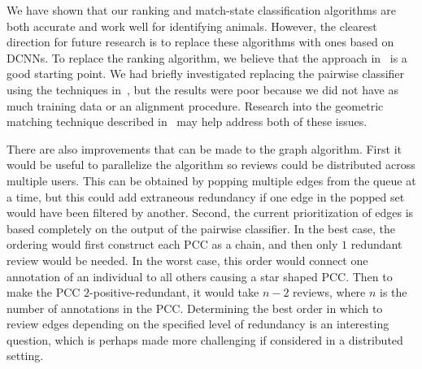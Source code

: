     We have shown that our ranking and match-state classification algorithms are both accurate and work well for
      identifying animals.
    However, the clearest direction for future research is to replace these algorithms with ones based on DCNNs.
    To replace the ranking algorithm, we believe that the approach in~\cite{arandjelovic_netvlad_2016} is a good
      starting point.
    We had briefly investigated replacing the pairwise classifier using the techniques
      in~\cite{taigman_deepface_2014}, but the results were poor because we did not have as much training data or
      an alignment procedure.
    Research into the geometric matching technique described in~\cite{rocco_convolutional_2017} may help address
      both of these issues.

    There are also improvements that can be made to the graph algorithm.
    First it would be useful to parallelize the algorithm so reviews could be distributed across multiple users.
    This can be obtained by popping multiple edges from the queue at a time, but this could add extraneous
      redundancy if one edge in the popped set would have been filtered by another.
    Second, the current prioritization of edges is based completely on the output of the pairwise classifier.
    In the best case, the ordering would first construct each PCC as a chain, and then only $1$ redundant review
      would be needed.
    In the worst case, this order would connect one annotation of an individual to all others causing a star
      shaped PCC.
    Then to make the PCC $2$-positive-redundant, it would take $n - 2$ reviews, where $n$ is the number of
      annotations in the PCC.
    Determining the best order in which to review edges depending on the specified level of redundancy is an
      interesting question, which is perhaps made more challenging if considered in a distributed setting.


